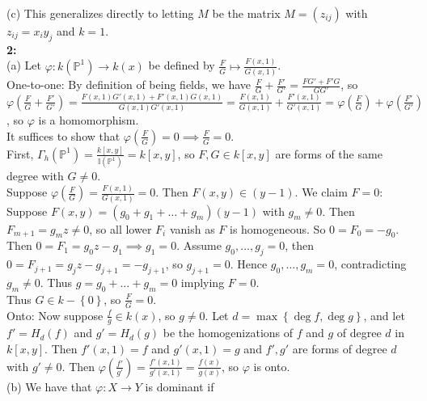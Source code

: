 \documentclass[a4paper]{article}
\begin{document}
 (c) This generalizes directly to letting $M$ be the matrix
 $M = (z_{ij})$ with $z_{ij} = x_i y_j$ and
 $k = 1$.\\
 \linebreak
 \textbf{2:}\\
 (a) Let $\varphi  \colon k\left( \mathbb{P}^{1} \right) 
 \to k(x)$ be defined by
 $\frac{F}{G} \mapsto \frac{F(x,1)}{G(x,1)}$.\\
 One-to-one: By definition of being fields, we have
 $\frac{F}{G}+ \frac{F'}{G'} = \frac{FG' + F'G}{G G'}$, so
 $\varphi \left( \frac{F}{G}+ \frac{F'}{G'} \right) 
 = \frac{F(x,1) G'(x,1) + F'(x,1) G(x,1)}{G(x,1)G'(x,1)}
 = \frac{F(x,1)}{G(x,1)} + \frac{F'(x,1)}{G'(x,1)}
 = \varphi\left( \frac{F}{G} \right) 
 + \varphi \left( \frac{F'}{G'} \right) $, so
 $\varphi$ is a homomorphism.\\
 It suffices to show that
 $\varphi \left( \frac{F}{G} \right) = 0 \implies
 \frac{F}{G}=0$.\\
 First, $\Gamma_h (\mathbb{P}^{1})
 = \frac{k\left[ x,y \right] }{\mathbb{I} \left( \mathbb{P}^{1} \right) }
 = k\left[ x,y \right] $, so
 $F,G \in k\left[ x,y \right] $ are forms of the same degree with
 $G \neq 0$.\\
 Suppose $\varphi \left( \frac{F}{G} \right) = \frac{F(x,1)}{
 G(x,1)}=0$. Then
 $F(x,y) \in (y-1)$. We claim
 $F = 0$:\\
 Suppose $F(x,y) = \left( g_0 + g_1+ \ldots + g_m \right) 
 (y-1)$ with $g_m \neq 0$. Then
 $F_{m+1} = g_m z \neq 0$, so all lower $F_i$ vanish as
 $F$ is homogeneous. So $0 = F_0 = -g_0$. Then
 $0 = F_1 = g_0 z - g_1 \implies g_1 = 0$. Assume
 $g_0 , \ldots, g_j = 0$, then
 $0 = F_{j+1}
 = g_{j} z - g_{j+1} = - g_{j+1}$, so
 $g_{j+1} = 0$. Hence
 $g_0, \ldots, g_m = 0$, contradicting
 $g_m \neq 0$. Thus
 $g = g_0 + \ldots + g_m = 0$ implying $F = 0$.\\
 Thus 
 $G \in k - \left\{ 0 \right\} $, so
 $\frac{F}{G} = 0$.\\
 Onto: Now suppose $\frac{f}{g} \in k(x)$, so $g \neq 0$.
 Let $d = \max \left\{ \deg f , \deg g \right\} $, and
 let  $f' = H_d(f)$ and $g' = H_d(g)$ be the homogenizations of
 $f$ and $g$ of degree $d$ in
 $k\left[ x,y \right] $. Then
 $f' (x,1) = f$ and $g' (x,1) = g$ and
 $f',g'$ are forms of degree
 $d$ with
 $g' \neq 0$. Then
 $\varphi \left( \frac{f'}{g'} \right) 
 = \frac{f'(x,1)}{g'(x,1)}= \frac{f(x)}{g(x)}$, so
 $\varphi$ is onto.\\
 \linebreak
 (b) We have that $\varphi  \colon X \to Y$ is dominant if
\end{document}
